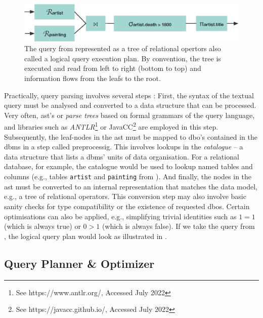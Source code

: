 \begin{figure}[tb]
    \centering
    \includegraphics[width=\textwidth]{figures/query-tree.eps}
    \caption{The query from  represented as a tree of relational opertors also called a logical query execution plan. By convention, the tree is executed and read from left to right (bottom to top) and information flows from the leafs to the root.}
    \label{figure:query-tree}
\end{figure}

Practically, query parsing involves several steps \cite{Graefe:1993Query,Garcia:2009Database}: First, the syntax of the textual query must be analysed and converted to a data structure that can be processed. Very often, \acrfull{ast}'s or \emph{parse trees} based on formal grammars of the query language, and libraries such as \emph{ANTLR}\footnote{See https://www.antlr.org/, Accessed July 2022} or JavaCC\footnote{See https://javacc.github.io/, Accessed July 2022} are employed in this step. Subsequently, the leaf-nodes in the \acrshort{ast} must be mapped to \acrfull{dbo}'s contained in the \acrshort{dbms} in a step called preprocessig. This involves lookups in the \emph{catalogue} -- a data structure that lists a \acrshort{dbms}' units of data organisation. For a relational database, for example, the catalogue would be used to lookup named tables and columns (e.g., tables \texttt{artist} and \texttt{painting} from ). And finally, the nodes in the \acrshort{ast} must be converted to an internal representation that matches the data model, e.g., a tree of relational operators. This conversion step may also involve basic sanity checks for type compatibility or the existence of requested \acrshort{dbo}s. Certain optimisations can also be applied, e.g., simplifying trivial identities such as $1 = 1$ (which is always true) or $0 > 1$ (which is always false). If we take the query from , the logical query plan would look as illustrated in .

\subsection{Query Planner \& Optimizer}

